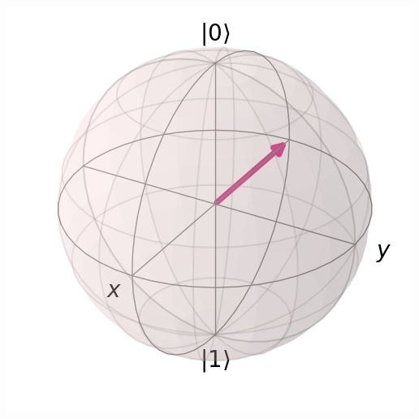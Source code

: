\documentclass[aspectratio=169,11pt,hyperref={colorlinks=true}]{beamer}
\begin{document}
\begin{frame}
{\begin{columns}
            \includegraphics[width=.9\textwidth]{bloch_h_negative.png}
        \end{columns}
    }
\end{frame}
\end{document}
